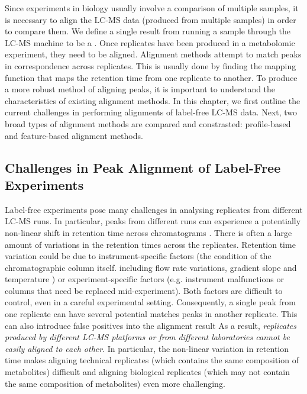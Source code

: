 Since experiments in biology usually involve a comparison of multiple samples, it is necessary to align the LC-MS data (produced from multiple samples) in order to compare them. We define a single result from running a sample through the LC-MS machine to be a . Once replicates have been produced in a metabolomic experiment, they need to be aligned. Alignment methods attempt to match peaks in correspondence across replicates. This is usually done by finding the mapping function that maps the retention time from one replicate to another. To produce a more robust method of aligning peaks, it is important to understand the characteristics of existing alignment methods. In this chapter, we first outline the current challenges in performing alignments of label-free LC-MS data. Next, two broad types of alignment methods are compared and constrasted: profile-based and feature-based alignment methods.

\subsection{\label{sec:Challenges-in-Peak}Challenges in Peak Alignment of Label-Free
Experiments}

Label-free experiments pose many challenges in analysing replicates from different LC-MS runs. In particular, peaks from different runs can experience a potentially non-linear shift in retention time across chromatograms \cite{Podwojski2009}. There is often a large amount of variations in the retention times across the replicates. Retention time variation could be due to instrument-specific factors (the condition of the chromatographic column itself. including flow rate variations, gradient slope and temperature \cite{Christin2008}) or experiment-specific factors (e.g. instrument malfunctions or columns that need be replaced mid-experiment). Both factors are difficult to control, even in a careful experimental setting. Consequently, a single peak from one replicate can have several potential matches peaks in another replicate. This can also introduce false positives into the alignment result As a result, \emph{replicates produced by different LC-MS platforms or from different laboratories cannot be easily aligned to each other}. In particular, the non-linear variation in retention time makes aligning technical replicates (which contains the same composition of metabolites) difficult and aligning biological replicates (which may not contain the same composition of metabolites) even more challenging.

